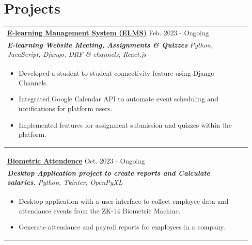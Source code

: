 \documentclass[a4paper,10pt]{article}
\begin{document}
    \section{Projects}
    \begin{tabularx}{\linewidth}{ @{}l r@{} }
\color[HTML]{1C033C} \textbf{\uline{\href{https://github.com/AdhamMadkour/elms-backend}{E-learning Management System (ELMS)}}} \hfill \color[HTML]{371e77} Feb. 2023 - Ongoing \\[4pt]
\color[HTML]{371e77}\textbf{\textit{E-learning Website Meeting, Assignments \& Quizzes}} \hfill \color[HTML]{4B28A4} \textit{Python, JavaScript, Django,  DRF \& channels, React.js } \\[5pt]
\begin{minipage}[t]{\linewidth}
    \begin{itemize}[nosep,after=\strut, leftmargin=2em, itemsep=2pt]
        \item Developed a student-to-student connectivity feature using Django Channels.
        \item Integrated Google Calendar API to automate event scheduling and notifications for platform users.
        \item Implemented features for assignment submission and quizzes within the platform.
    \end{itemize}
\end{minipage}
    \end{tabularx}

    \begin{tabularx}{\linewidth}{ @{}l r@{} }
\color[HTML]{1C033C} \textbf{\uline{\href{https://github.com/AdhamMadkour/Biometric-Attendence}{Biometric Attendence}}} \hfill \color[HTML]{371e77} Oct. 2023 - Ongoing \\[4pt]
\color[HTML]{371e77}\textbf{\textit{Desktop Application project to create reports and Calculate salaries.}} \hfill \color[HTML]{4B28A4} \textit{Python, Tkinter, OpenPyXL } \\[5pt]
\begin{minipage}[t]{\linewidth}
    \begin{itemize}[nosep,after=\strut, leftmargin=2em, itemsep=2pt]
        \item Desktop application with a user interface to collect employee data and attendance events from the ZK-14 Biometric Machine.
        \item Generate attendance and payroll reports for employees in a company.
    \end{itemize}
\end{minipage}
    \end{tabularx}
\end{document}
